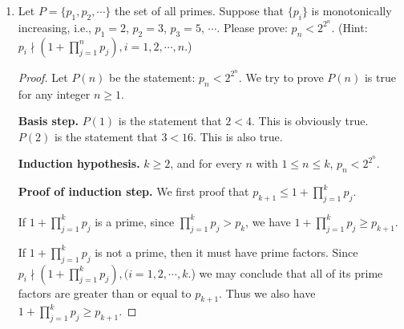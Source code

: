 \documentclass[12pt,a4paper]{article}
\theoremstyle{definition}
\begin{document}
\begin{enumerate}
\begin{proof}
        if $P(n)$ is not true, then there are values of $n$ for which $P(n)$ is false, and there must be a smallest such value, say $n = k$.
        
        Since $P(18) = 1 \times 4 + 2 \times 7$, we have $k > 18$, and $k-1 > 17$.
        
        Since $k$ is the smallest value for which $P(k)$ is false, $P(k-1)$ is true. Thus there exist integers $i_{k-1}$ and $j_{k-1}$, such that $k-1 = i_{k-1} \times 4 + j_{k-1} \times 7$. Note that $i_{k-1} \geq 1$, and $j_{k-1} \geq 2$.
        
        However, we have
        \begin{eqnarray*}
        	k & = & (k-1) + 1 \\
        	& = & (i_{k-1} \times 4 + j_{k-1} \times 7) + 1\\
        	& = & (i_{k-1} + 2) \times 4 + (j_{k-1} - 1) \times 7
        \end{eqnarray*}
    Since $i_{k-1}+2 \geq 0$ and $j_{k-1}-1 \geq 0$, we have $P(k)$ is true. We have derived a contradiction, which allows us to conclude that our original assumption is false.
    \end{proof}

    \item
    Let $P=\{p_1, p_2, \cdots\}$ the set of all primes. Suppose that $\{p_i\}$ is monotonically    increasing, i.e., $p_1=2$, $p_2=3$, $p_3=5$, $\cdots$. Please prove: $p_n<2^{2^n}$. {\color{blue}(Hint: $p_i \nmid (1+\prod_{j=1}^n p_j), i=1,2,\cdots,n$.)}
    \begin{proof}
        Let $P(n)$ be the statement: $p_n<2^{2^n}$. We try to prove $P(n)$ is true for any integer $n \geq 1$.
        
        \textbf{Basis step.} $P(1)$ is the statement that $2 < 4$. This is obviously true. $P(2)$ is the statement that $3 < 16$. This is also true.
        
        \textbf{Induction hypothesis.} $k \geq 2$, and for every $n$ with $1 \leq n \leq k$, $p_{n} < 2^{2^{n}}$.
        
        \textbf{Proof of induction step.} We first proof that $p_{k+1} \leq 1 + \prod_{j=1}^{k}p_{j}$.
        
        If $1 + \prod_{j=1}^{k}p_{j}$ is a prime, since $\prod_{j=1}^{k}p_{j} > p_{k}$, we have $1 + \prod_{j=1}^{k}p_{j} \geq p_{k+1}$.
        
        If $1 + \prod_{j=1}^{k}p_{j}$ is not a prime, then it must have prime factors.
        Since $p_i \nmid (1+\prod_{j=1}^{k} p_j), (i=1,2,\cdots,k$.) we may conclude that all of its prime factors are greater than or equal to $p_{k+1}$. Thus we also have $1 + \prod_{j=1}^{k}p_{j} \geq p_{k+1}$.
        

\end{proof}
\end{enumerate}
\end{document}
